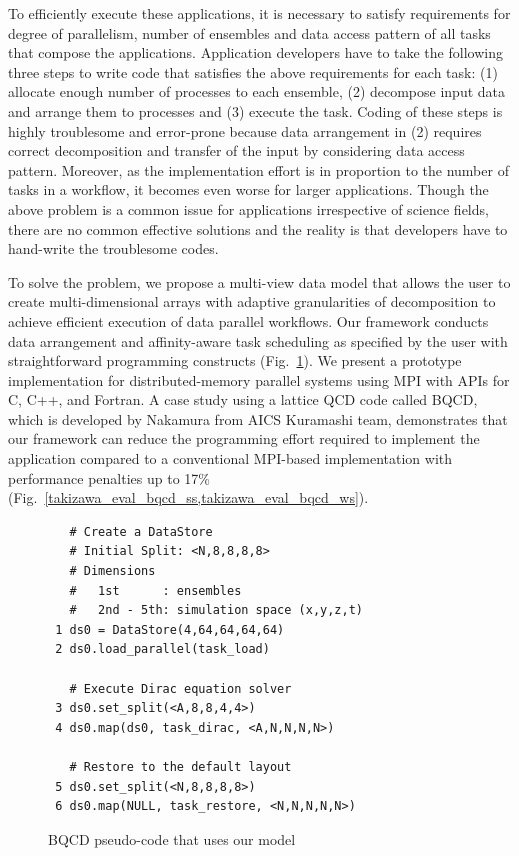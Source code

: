 \documentclass{book}
\begin{document}
To efficiently execute these applications, it is necessary to satisfy requirements for degree of parallelism, number of ensembles and data access pattern of all tasks that compose the applications.
Application developers have to take the following three steps to write code that satisfies the above requirements for each task: (1) allocate enough number of processes to each ensemble, (2) decompose input data and arrange them to processes and (3) execute the task.
Coding of these steps is highly troublesome and error-prone because data arrangement in (2) requires correct decomposition and transfer of the input by considering data access pattern.
Moreover, as the implementation effort is in proportion to the number of tasks in a workflow, it becomes even worse for larger applications.
Though the above problem is a common issue for applications irrespective of science fields, there are no common effective solutions and the reality is that developers have to hand-write the troublesome codes.

To solve the problem, we propose a multi-view data model that allows the user to create multi-dimensional arrays with adaptive granularities of decomposition to achieve efficient execution of data parallel workflows.
Our framework conducts data arrangement and affinity-aware task scheduling as specified by the user with straightforward programming constructs (Fig.~\ref{takizawa_sample}).
We present a prototype implementation for distributed-memory parallel systems using MPI with APIs for C, C++, and Fortran.
A case study using a lattice QCD code called BQCD, which is developed by Nakamura from AICS Kuramashi team, demonstrates that our framework can reduce the programming effort required to implement the application compared to a conventional MPI-based implementation with performance penalties up to 17\% (Fig.~\ref{takizawa_eval_bqcd_ss,takizawa_eval_bqcd_ws}).

\begin{figure}[t]
\centering
\begin{verbatim}
   # Create a DataStore
   # Initial Split: <N,8,8,8,8>
   # Dimensions
   #   1st      : ensembles
   #   2nd - 5th: simulation space (x,y,z,t)
 1 ds0 = DataStore(4,64,64,64,64)
 2 ds0.load_parallel(task_load)

   # Execute Dirac equation solver
 3 ds0.set_split(<A,8,8,4,4>)
 4 ds0.map(ds0, task_dirac, <A,N,N,N,N>)

   # Restore to the default layout
 5 ds0.set_split(<N,8,8,8,8>)
 6 ds0.map(NULL, task_restore, <N,N,N,N,N>)
\end{verbatim}
\caption{BQCD pseudo-code that uses our model}
\label{takizawa_sample}
\end{figure}
\end{document}
